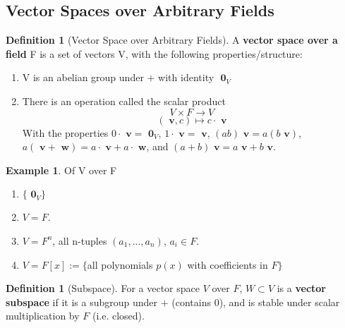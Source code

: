 \documentclass[12pt]{article}
\theoremstyle{definition}
\newtheorem{defn}[thm]{Definition}
\newtheorem{eg}[thm]{Example}
\theoremstyle{remark}
\numberwithin{equation}{section}
\newcommand\B[1]{\textbf{ #1}}
\begin{document}
\vspace{15pt}

\subsection{Vector Spaces over Arbitrary Fields}

\begin{defn}[Vector Space over Arbitrary Fields]
        A \B{vector space over a field} F is a set of vectors V, with the following properties/structure:\begin{enumerate}
                \item V is an abelian group under $+$ with identity $\B{0}_V$
                \item There is an operation called the scalar product \begin{equation}
                                V\times F \rightarrow V
                \end{equation}
                        \begin{equation}
                                (\B{v},c)\mapsto c\cdot \B{v}
                        \end{equation}
                        With the properties $0\cdot\B{v} = \B{0}_V$, $1\cdot \B{v} = \B{v}$, $(ab)\B{v} = a(b\B{v})$, $a(\B{v}+\B{w}) = a\cdot\B{v}+a\cdot\B{w}$, and $(a+b)\B{v} = a\B{v}+b\B{v}$.
        \end{enumerate}
\end{defn}


\vspace{15pt}
\begin{eg}
        Of V over F
        \begin{enumerate}
                \item $\{\B{0}_V\}$
                \item $V = F$.
                \item $V = F^n$, all n-tuples $(a_1,...,a_n)$, $a_i \in F$.
                \item $V = F[x]:= \{$all polynomials $p(x)$ with coefficients in $F\}$
        \end{enumerate}
\end{eg}


\vspace{15pt}

\begin{defn}[Subspace]
        For a vector space $V$ over $F$, $W \subset V$ is a \B{vector subspace} if it is a subgroup under $+$ (contains $0$), and is stable under scalar multiplication by $F$ (i.e. closed).
\end{defn}
\end{document}
